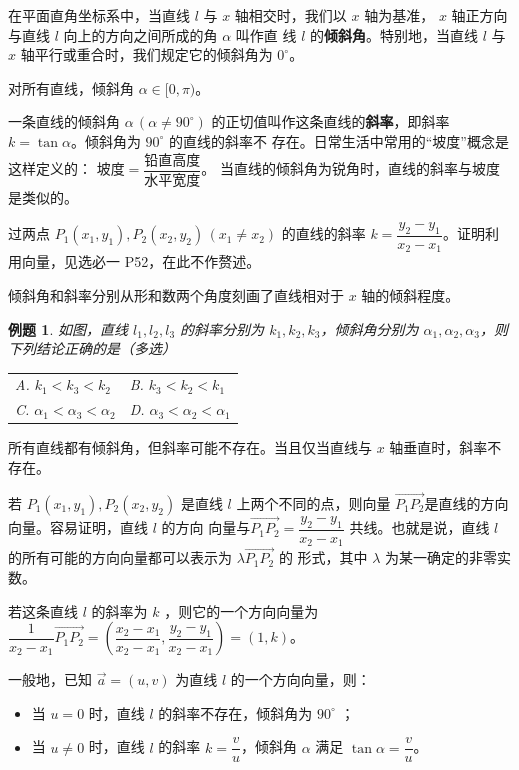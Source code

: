 \documentclass[a4paper,openany]{ctexbook}
\newcounter{examplecounter}[section]
\newtheorem{example}[examplecounter]{例题}
\renewcommand{\vec}{\overrightarrow}
\begin{document}
在平面直角坐标系中，当直线 \(l\) 与 \(x\) 轴相交时，我们以 \(x\) 轴为基准， \(x\) 轴正方向与直线 \(l\) 向上的方向之间所成的角 \(\alpha\) 叫作直
线 \(l\) 的\textbf{倾斜角}。特别地，当直线 \(l\) 与 \(x\) 轴平行或重合时，我们规定它的倾斜角为 \(0^\circ\)。

对所有直线，倾斜角 \(\alpha \in [0,\pi )\)。

一条直线的倾斜角 \(\alpha\,(\alpha \neq 90^\circ)\) 的正切值叫作这条直线的\textbf{斜率}，即斜率 \(k = \tan \alpha\)。倾斜角为 \(90^\circ\) 的直线的斜率不
存在。日常生活中常用的“坡度”概念是这样定义的： \(\text{坡度} = \dfrac{\text{铅直高度}}{\text{水平宽度}} \)。 当直线的倾斜角为锐角时，直线的斜率与坡度是类似的。

过两点 \(P_1(x_1,y_1),P_2(x_2,y_2)\, (x_1 \neq x_2)\) 的直线的斜率 \(k = \dfrac{y_2 - y_1}{x_2 - x_1} \)。证明利用向量，见选必一 P52，在此不作赘述。

倾斜角和斜率分别从形和数两个角度刻画了直线相对于 \(x\) 轴的倾斜程度。

\begin{example}
    如图，直线 \(l_1,l_2,l_3\) 的斜率分别为 \(k_1,k_2,k_3\)，倾斜角分别为 \(\alpha_1,\alpha_2,\alpha_3\)，则下列结论正确的是（多选）
    \begin{tabular}{ll}
        A. \(k_1 < k_3 < k_2\)                & B. \(k_3 < k_2 < k_1\)                \\
        C. \(\alpha_1 < \alpha_3 < \alpha_2\) & D. \(\alpha_3 < \alpha_2 < \alpha_1\)
    \end{tabular}
\end{example}

所有直线都有倾斜角，但斜率可能不存在。当且仅当直线与 \(x\) 轴垂直时，斜率不存在。

若 \(P_1(x_1,y_1),P_2(x_2,y_2)\) 是直线 \(l\) 上两个不同的点，则向量 \(\vec{P_1P_2}\)是直线的方向向量。容易证明，直线 \(l\) 的方向
向量与\(\vec{P_1P_2} = \dfrac{y_2 - y_1}{x_2 - x_1} \) 共线。也就是说，直线 \(l\) 的所有可能的方向向量都可以表示为 \(\lambda\vec{P_1P_2}\) 的
形式，其中 \(\lambda\) 为某一确定的非零实数。

若这条直线 \(l\) 的斜率为 \(k\) ，则它的一个方向向量为
\(\dfrac{1}{x_2 - x_1}\vec{P_1P_2} = \left(\dfrac{x_2 - x_1}{x_2 - x_1},\dfrac{y_2 - y_1}{x_2 - x_1} \right) =(1,k)\)。

一般地，已知 \(\vec{a} =(u,v)\) 为直线 \(l\) 的一个方向向量，则：
\begin{itemize}
    \item 当 \(u = 0\) 时，直线 \(l\) 的斜率不存在，倾斜角为 \(90^\circ\) ；
    \item 当 \(u \neq 0\) 时，直线 \(l\) 的斜率 \(k = \dfrac{v}{u}\)，倾斜角 \(\alpha\) 满足 \(\tan \alpha = \dfrac{v}{u}\)。
\end{itemize}
\end{document}
